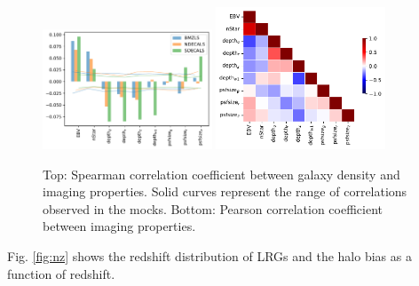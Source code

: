 \begin{figure}
    \includegraphics[width=0.45\textwidth]{figures/pcc.pdf} 
    \includegraphics[width=0.45\textwidth]{figures/pccx.pdf}     
    \caption{Top: Spearman correlation coefficient between galaxy density and imaging properties. Solid curves represent the range of correlations observed in the mocks. Bottom: Pearson correlation coefficient between imaging properties.}
    \label{fig:pcc}
\end{figure}



Fig. \ref{fig:nz} shows the redshift distribution of LRGs and the halo bias as a function of redshift. 



